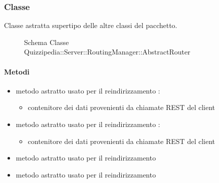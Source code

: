 \subsubsection{Classe }
Classe astratta supertipo delle altre classi del pacchetto.
\begin{figure}[H]
\centering
\noindent{}
\caption[Schema Classe AbstractRouter]{Schema Classe Quizzipedia::Server::RoutingManager::AbstractRouter}
\end{figure}
\paragraph{Metodi}
\begin{itemize}
\item {}
\newline
metodo astratto usato per il reindirizzamento
\newline
{} :
\begin{itemize}
\item {}
\newline
contenitore dei dati provenienti da chiamate REST del client
\end{itemize}
\item {}
\newline
metodo astratto usato per il reindirizzamento
\newline
{} :
\begin{itemize}
\item {}
\newline
contenitore dei dati provenienti da chiamate REST del client
\end{itemize}
\item {}
\newline
metodo astratto usato per il reindirizzamento
\newline
\item {}
\newline
metodo astratto usato per il reindirizzamento
\newline
\end{itemize}
